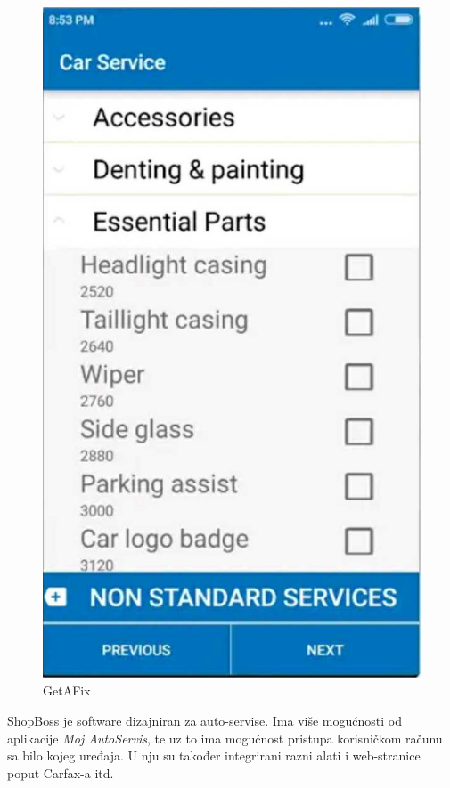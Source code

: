 		\begin{figure}[H]
			\includegraphics[scale=0.2]{slike/getafix.JPG}
			\centering
			\caption{GetAFix}
			\label{fig:idk}
		\end{figure}  
		
		ShopBoss je software dizajniran za auto-servise. Ima više mogućnosti od aplikacije \textit{Moj AutoServis}, te uz to ima mogućnost pristupa korisničkom računu sa bilo kojeg uređaja. U nju su također integrirani razni alati i web-stranice poput Carfax-a itd.
		
